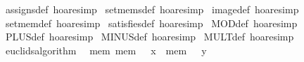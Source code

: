\begin{isabellebody}
{}%
\endisatagML
{\isafoldML}%
%
\isadelimML
\isanewline
%
\endisadelimML
\isanewline
{}\isamarkupfalse%
\ assigns{}def\ {}hoare{}simp{}\isanewline
{}\isamarkupfalse%
\ set{}mems{}def\ {}hoare{}simp{}\isanewline
{}\isamarkupfalse%
\ image{}def\ {}hoare{}simp{}\isanewline
{}\isamarkupfalse%
\ set{}mem{}def\ {}hoare{}simp{}\isanewline
{}\isamarkupfalse%
\ satisfies{}def\ {}hoare{}simp{}\isanewline
{}\isamarkupfalse%
\ MOD{}def\ {}hoare{}simp{}\isanewline
{}\isamarkupfalse%
\ PLUS{}def\ {}hoare{}simp{}\isanewline
{}\isamarkupfalse%
\ MINUS{}def\ {}hoare{}simp{}\isanewline
{}\isamarkupfalse%
\ MULT{}def\ {}hoare{}simp{}\isanewline
\isanewline
{}\isamarkupfalse%
\ euclids{}algorithm{}\isanewline
\ \ {}{}{}mem{}\ mem\ {}\ {}\ x\ {}\ mem\ {}\ {}\ y{}{}\isanewline

\end{isabellebody}
